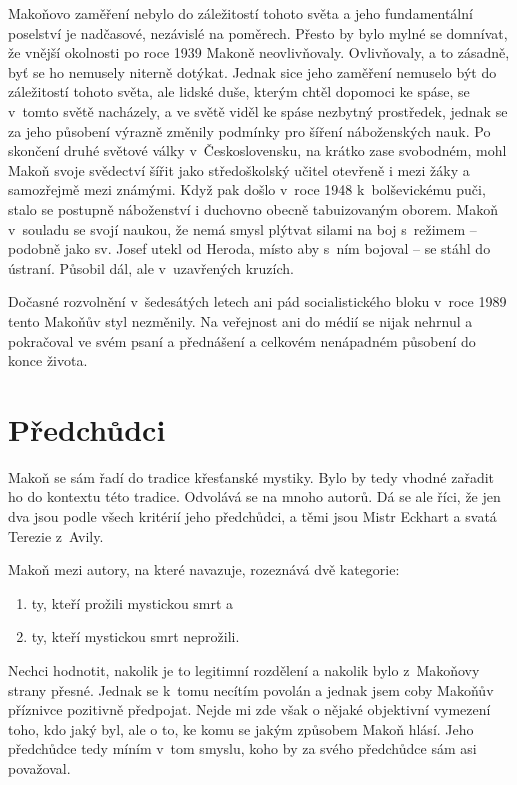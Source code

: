 Makoňovo zaměření nebylo do záležitostí tohoto světa a jeho fundamentální
poselství je nadčasové, nezávislé na poměrech. Přesto by bylo mylné se domnívat,
že vnější okolnosti po roce 1939 Makoně neovlivňovaly. Ovlivňovaly, a to
zásadně, byť se ho nemusely niterně dotýkat. Jednak sice jeho zaměření nemuselo
být do záležitostí tohoto světa, ale lidské duše, kterým chtěl dopomoci ke
spáse, se v~tomto světě nacházely, a ve světě viděl ke spáse nezbytný
prostředek, jednak se za jeho působení výrazně změnily podmínky pro šíření
náboženských nauk. Po skončení druhé světové války v~Československu, na krátko
zase svobodném, mohl Makoň svoje svědectví šířit jako středoškolský učitel
otevřeně i mezi žáky a samozřejmě mezi známými. Když pak došlo v~roce 1948
k~bolševickému puči, stalo se postupně náboženství i duchovno obecně
tabuizovaným oborem\cite{kaplan1993stat}. Makoň v~souladu se svojí naukou, že nemá smysl plýtvat
silami na boj s~režimem -- podobně jako sv. Josef utekl od Heroda, místo aby
s~ním bojoval -- se stáhl do ústraní. Působil dál, ale v~uzavřených kruzích.

Dočasné rozvolnění v~šedesátých letech ani pád socialistického bloku v~roce 1989
tento Makoňův styl nezměnily. Na veřejnost ani do médií se nijak nehrnul a
pokračoval ve svém psaní a přednášení a celkovém nenápadném působení do konce
života.

\section{Předchůdci}

Makoň se sám řadí do tradice křesťanské mystiky. Bylo by tedy vhodné zařadit ho
do kontextu této tradice. Odvolává se na mnoho autorů. Dá se ale říci, že jen
dva jsou podle všech kritérií jeho předchůdci, a těmi jsou Mistr Eckhart a svatá
Terezie z~Avily.

Makoň mezi autory, na které navazuje, rozeznává dvě kategorie:
\begin{enumerate}
\item{ty, kteří prožili mystickou smrt a}
\item{ty, kteří mystickou smrt neprožili.}
\end{enumerate}
Nechci hodnotit, nakolik je to legitimní rozdělení a nakolik bylo
z~Makoňovy strany přesné. Jednak se k~tomu necítím povolán a jednak jsem coby
Makoňův příznivce pozitivně předpojat. Nejde mi zde však o nějaké objektivní
vymezení toho, kdo jaký byl, ale o to, ke komu se jakým způsobem Makoň hlásí.
Jeho předchůdce tedy míním v~tom smyslu, koho by za svého předchůdce sám asi
považoval.

